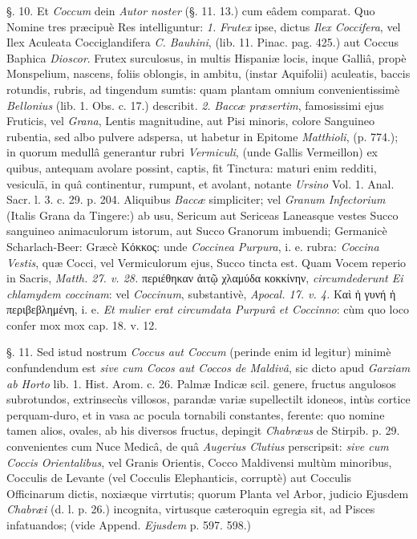 \documentclass[a4paper, 11pt, oneside, polutonikogreek, german]{article}
\begin{document}
§. 10. Et \emph{Coccum} dein \emph{Autor noster} (§. 11. 13.) cum eâdem comparat. Quo Nomine tres præcipuè Res intelliguntur: \emph{1.} \emph{Frutex} ipse, dictus \emph{Ilex Coccifera}, vel Ilex Aculeata Cocciglandifera \emph{C. Bauhini}, (lib. 11. Pinac. pag. 425.) aut Coccus Baphica \emph{Dioscor}. Frutex surculosus, in multis Hispaniæ locis, inque Galliâ, propè Monspelium, nascens, foliis oblongis, in ambitu, (instar Aquifolii) aculeatis, baccis rotundis, rubris, ad tingendum sumtis: quam plantam omnium convenientissimè \emph{Bellonius} (lib. 1. Obs. c. 17.) describit. \emph{2.} \emph{Baccæ præsertim}, famosissimi ejus Fruticis, vel \emph{Grana}, Lentis magnitudine, aut Pisi minoris, colore Sanguineo rubentia, sed albo pulvere adspersa, ut habetur in Epitome \emph{Matthioli}, (p. 774.); in quorum medullâ generantur rubri \emph{Vermiculi}, (unde Gallis Vermeillon) ex quibus, antequam avolare possint, captis, fit Tinctura: maturi enim redditi, vesiculā, in quâ continentur, rumpunt, et avolant, notante \emph{Ursino} Vol. 1. Anal. Sacr. l. 3. c. 29. p. 204. Aliquibus \emph{Baccæ} simpliciter; vel \emph{Granum Infectorium} (Italis Grana da Tingere:) ab usu, Sericum aut Sericeas Laneasque vestes Succo sanguineo animaculorum istorum, aut Succo Granorum imbuendi; Germanicè Scharlach-Beer: Græcè Κόκκος: unde \emph{Coccinea Purpura}, i. e. rubra: \emph{Coccina Vestis}, quæ Cocci, vel Vermiculorum ejus, Succo tincta est. Quam Vocem reperio in Sacris, \emph{Matth. 27. v. 28.} περιέθηκαν ἀιτῷ χλαμύδα κοκκίνην, \emph{circumdederunt Ei chlamydem coccinam}: vel \emph{Coccinum}, substantivè, \emph{Apocal. 17. v. 4.} Καὶ ἡ γυνή ἡ περιβεβλημένη, i. e. \emph{Et mulier erat circumdata Purpurâ et Coccinno}: cùm quo loco confer mox mox cap. 18. v. 12.

§. 11. Sed istud nostrum \emph{Coccus aut Coccum} (perinde enim id legitur) minimè confundendum est \emph{sive cum Cocos aut Coccos de Maldivâ}, sic dicto apud \emph{Garziam ab Horto} lib. 1. Hist. Arom. c. 26. Palmæ Indicæ scil. genere, fructus angulosos subrotundos, extrinsecùs villosos, parandæ variæ supellectilt idoneos, intùs cortice perquam-duro, et in vasa ac pocula tornabili constantes, ferente: quo nomine tamen alios, ovales, ab his diversos fructus, depingit \emph{Chabræus} de Stirpib. p. 29. convenientes cum Nuce Medicâ, de quâ \emph{Augerius Clutius} perscripsit: \emph{sive cum Coccis Orientalibus}, vel Granis Orientis, Cocco Maldivensi multùm minoribus, Cocculis de Levante (vel Cocculis Elephanticis, corruptè) aut Cocculis Officinarum dictis, noxiæque virrtutis; quorum Planta vel Arbor, judicio Ejusdem \emph{Chabræi} (d. l. p. 26.) incognita, virtusque cæteroquin egregia sit, ad Pisces infatuandos; (vide Append. \emph{Ejusdem} p. 597. 598.)
\end{document}
